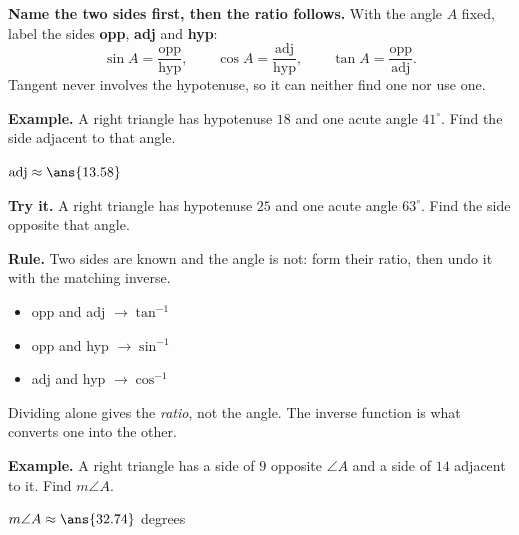 \documentclass[12pt]{article}
\begin{document}


\begin{formulabox}
\textbf{Name the two sides first, then the ratio follows.} With the angle $A$
fixed, label the sides \textbf{opp}, \textbf{adj} and \textbf{hyp}:
\[ \sin A = \frac{\text{opp}}{\text{hyp}}, \qquad
   \cos A = \frac{\text{adj}}{\text{hyp}}, \qquad
   \tan A = \frac{\text{opp}}{\text{adj}}. \]
Tangent never involves the hypotenuse, so it can neither find one nor use one.
\end{formulabox}

\begin{examplebox}
\textbf{Example.} A right triangle has hypotenuse $18$ and one acute angle
$41^\circ$. Find the side adjacent to that angle.

$\text{adj} \approx \ans{13.58}$
\end{examplebox}

\begin{tryitbox}
\textbf{Try it.} A right triangle has hypotenuse $25$ and one acute angle
$63^\circ$. Find the side opposite that angle.\\[2pt]
\end{tryitbox}


\begin{formulabox}
\textbf{Rule.} Two sides are known and the angle is not: form their ratio, then
undo it with the matching inverse.
\begin{itemize}[leftmargin=0.6cm, itemsep=1pt, topsep=2pt]
  \item opp and adj $\rightarrow \tan^{-1}$
  \item opp and hyp $\rightarrow \sin^{-1}$
  \item adj and hyp $\rightarrow \cos^{-1}$
\end{itemize}
Dividing alone gives the \emph{ratio}, not the angle. The inverse function is
what converts one into the other.
\end{formulabox}

\begin{examplebox}
\textbf{Example.} A right triangle has a side of $9$ opposite $\angle A$ and a
side of $14$ adjacent to it. Find $m\angle A$.

$m\angle A \approx \ans{32.74}$ degrees
\end{examplebox}
\end{document}

